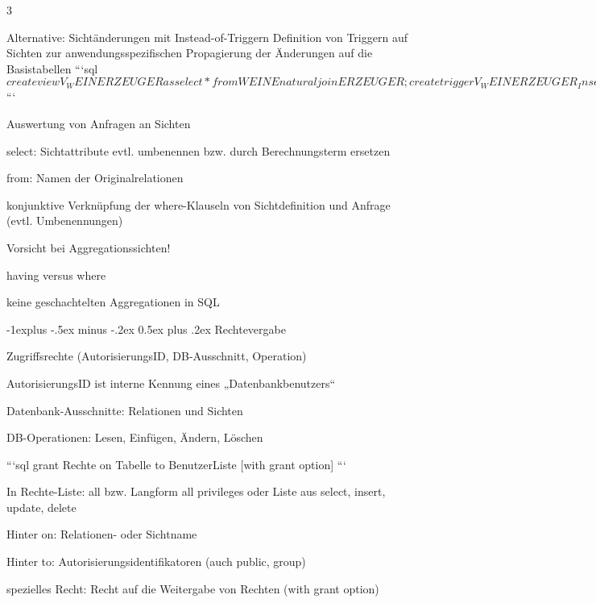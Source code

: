 \documentclass[a4paper]{article}
\makeatletter
\renewcommand{\subsection}{\@startsection{subsection}{2}{0mm}%
                                {-1explus -.5ex minus -.2ex}%
                                {0.5ex plus .2ex}%
                                {\normalfont\normalsize\bfseries}}
\makeatother
\begin{document}
\begin{multicols}{3}
\begin{itemize*}
        Alternative: Sichtänderungen mit Instead-of-Triggern
        Definition von Triggern auf Sichten zur anwendungsspezifischen Propagierung der Änderungen auf die Basistabellen
        ```sql$
            create view V_WEINERZEUGER as
            select * from WEINE natural join ERZEUGER;
            create trigger V_WEINERZEUGER_Insert
            instead of insert on V_WEINERZEUGER
            referencing new as N
            for each row
            begin
            insert into WEINE values (:N.WeinID, :N.Name,
            :N.Farbe, :N.Jahrgang, :N.Weingut);
            end;$
        ```

        Auswertung von Anfragen an Sichten
        \begin{itemize*}
            \item select: Sichtattribute evtl. umbenennen bzw. durch Berechnungsterm ersetzen
            \item  from: Namen der Originalrelationen
            \item konjunktive Verknüpfung der where-Klauseln von Sichtdefinition und Anfrage (evtl. Umbenennungen)
            \item Vorsicht bei Aggregationssichten!
            \begin{itemize*}
                \item having versus where
                \item keine geschachtelten Aggregationen in SQL
            \end{itemize*}
        \end{itemize*}

        \subsection{Rechtevergabe}
        \begin{itemize*}
            \item Zugriffsrechte (AutorisierungsID, DB-Ausschnitt, Operation)
            \item AutorisierungsID ist interne Kennung eines „Datenbankbenutzers“
            \item Datenbank-Ausschnitte: Relationen und Sichten
            \item DB-Operationen: Lesen, Einfügen, Ändern, Löschen
        \end{itemize*}

        ```sql
        grant Rechte
        on Tabelle
        to BenutzerListe
            [with grant option]
        ```
        \begin{itemize*}
            \item In Rechte-Liste: all bzw. Langform all privileges oder Liste aus select, insert, update, delete
            \item Hinter on: Relationen- oder Sichtname
            \item Hinter to: Autorisierungsidentifikatoren (auch public, group)
            \item spezielles Recht: Recht auf die Weitergabe von Rechten (with grant option)
        \end{itemize*}


\end{itemize*}
\end{multicols}
\end{document}
